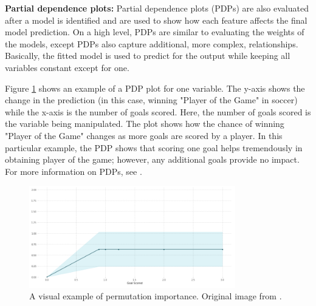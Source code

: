 \textbf{Partial dependence plots:} Partial dependence plots (PDPs) are also evaluated after a model is identified and are used to show how each feature affects the final model prediction.  On a high level, PDPs are similar to evaluating the weights of the models, except PDPs also capture additional, more complex, relationships.  Basically, the fitted model is used to predict for the output while keeping all variables constant except for one.  

Figure \ref{fig:03pdp} shows an example of a PDP plot for one variable.  The y-axis shows the change in the prediction (in this case, winning "Player of the Game" in soccer) while the x-axis is the number of goals scored. Here, the number of goals scored is the variable being manipulated. The plot shows how the chance of winning "Player of the Game" changes as more goals are scored by a player.  In this particular example, the PDP shows that scoring one goal helps tremendously in obtaining player of the game; however, any additional goals provide no impact. For more information on PDPs, see \cite{pdp}.

\begin{figure}[H]
    \centering
    \includegraphics[width=0.8\textwidth]{images/ch3/pdp.jpeg}
    \caption{A visual example of permutation importance. Original image from \cite{pdp_plot}.}
    \label{fig:03pdp}
\end{figure}


